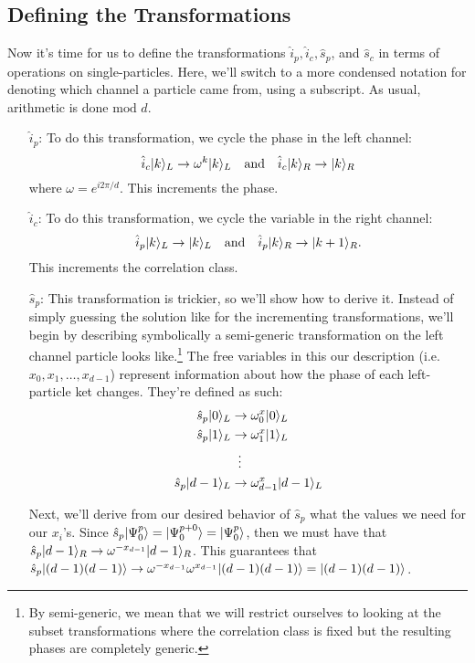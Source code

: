
\subsection{Defining the Transformations}
Now it's time for us to define the transformations $\hat{i}_p, \hat{i}_c, \hat{s}_p$, and $\hat{s}_c$ in terms of operations on single-particles. Here, we'll switch to a more condensed notation for denoting which channel a particle came from, using a subscript. As usual, arithmetic is done $\text{mod } d$. 
\begin{enumerate}
  \item[$\hat{i}_p$:] To do this transformation, we cycle the phase in the left channel:
  \[
  \hat{i}_c | k \rangle_L \rightarrow \omega^k | k \rangle_L \quad \text{and} \quad \hat{i}_c | k \rangle_R \rightarrow | k \rangle_R
  \]
  where $\omega = e^{i 2 \pi / d}$. This increments the phase.
  \item[$\hat{i}_c$:] To do this transformation, we cycle the variable in the right channel:
  \[
  \hat{i}_p | k \rangle_L \rightarrow | k \rangle_L \quad \text{and} \quad \hat{i}_p | k \rangle_R \rightarrow | k + 1 \rangle_R.
  \]
  This increments the correlation class.
  \item[$\hat{s}_p$:] This transformation is trickier, so we'll show how to derive it. Instead of simply guessing the solution like for the incrementing transformations, we'll begin by describing symbolically a semi-generic transformation on the left channel particle looks like.\footnote{By semi-generic, we mean that we will restrict ourselves to looking at the subset transformations where the correlation class is fixed but the resulting phases are completely generic.} The free variables in this our description (i.e. $x_0, x_1, \ldots, x_{d-1}$) represent information about how the phase of each left-particle ket changes. They're defined as such:
\begin{equation}
\begin{split}
    \hat{s}_p | 0 \rangle_L & \rightarrow \omega^x_0 | 0 \rangle_L \\
    \hat{s}_p | 1 \rangle_L & \rightarrow \omega^x_1 | 1 \rangle_L \\
    & \; \; \vdots \\
    \hat{s}_p | d-1 \rangle_L & \rightarrow \omega^x_{d-1}| d-1 \rangle_L
\end{split}
\end{equation}

Next, we'll derive from our desired behavior of $\hat{s}_p$ what the values we need for our $x_i$'s. Since $\hat{s}_p | \Psi_0^p \rangle = | \Psi_0^{p+0} \rangle = | \Psi_0^p \rangle$, then we must have that $\hat{s}_p | d-1 \rangle_R \rightarrow \omega^{-x_{d-1}}| d-1 \rangle_R$. This guarantees that $\hat{s}_p | (d-1)(d-1) \rangle \rightarrow \omega^{-x_{d-1}}\omega^{x_{d-1}} | (d-1)(d-1) \rangle = | (d-1)(d-1) \rangle$.


\end{enumerate}
